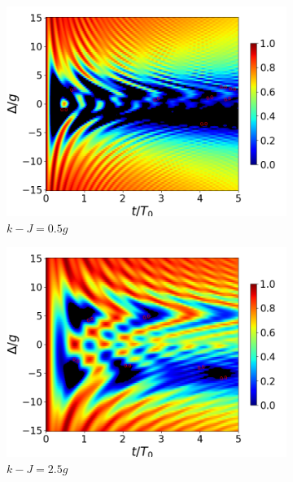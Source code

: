 \begin{figure}[h]
    \vfill
    \begin{subfigure}{0.49\textwidth}
        \includegraphics[width=\textwidth]{figuras/ch4/concu/delta/eg1+ge1 k=0.5g x=0.0g J=0.0g gamma=0.25g concu delta dis.png}
        \caption{$k-J=0.5g$}
        \label{fig4:concu detunning 1 k1}
    \end{subfigure}
    \hfill
    \begin{subfigure}{0.49\textwidth}
        \includegraphics[width=\textwidth]{figuras/ch4/concu/delta/eg1+ge1 k=2.5g x=0.0g J=0.0g gamma=0.25g concu delta dis.png}
        \caption{$k-J=2.5g$}
        \label{fig4:concu detunning 1 k2}
    \end{subfigure}
    \caption{}
    \label{fig4:concu detunning 1 params}
\end{figure}
